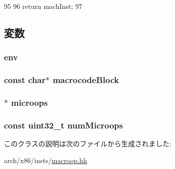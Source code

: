 \begin{DoxyCode}
95     {
96         return machInst;
97     }
\end{DoxyCode}


\subsection{変数}
\hypertarget{classX86ISA_1_1MacroopBase_aaa3a693f14966d4271ab8c5ae49e237a}{
\subsubsection[{env}]{ {\bf env}}}
\label{classX86ISA_1_1MacroopBase_aaa3a693f14966d4271ab8c5ae49e237a}
\hypertarget{classX86ISA_1_1MacroopBase_a4bb2294ae33b6e4711ffe6fda155d6c5}{
\subsubsection[{macrocodeBlock}]{\setlength{\rightskip}{0pt plus 5cm}const char$\ast$ {\bf macrocodeBlock}}}
\label{classX86ISA_1_1MacroopBase_a4bb2294ae33b6e4711ffe6fda155d6c5}
\hypertarget{classX86ISA_1_1MacroopBase_ac1f667f8d22e9d12a688bede2c0bd6f8}{
\subsubsection[{microops}]{$\ast$ {\bf microops}}}
\label{classX86ISA_1_1MacroopBase_ac1f667f8d22e9d12a688bede2c0bd6f8}
\hypertarget{classX86ISA_1_1MacroopBase_a57f09f4f3d1df5e805d55d76eb6db4fd}{
\subsubsection[{numMicroops}]{\setlength{\rightskip}{0pt plus 5cm}const {\bf uint32\_\-t} {\bf numMicroops}}}
\label{classX86ISA_1_1MacroopBase_a57f09f4f3d1df5e805d55d76eb6db4fd}


このクラスの説明は次のファイルから生成されました:\begin{DoxyCompactItemize}
\item 
arch/x86/insts/\hyperlink{macroop_8hh}{macroop.hh}\end{DoxyCompactItemize}
